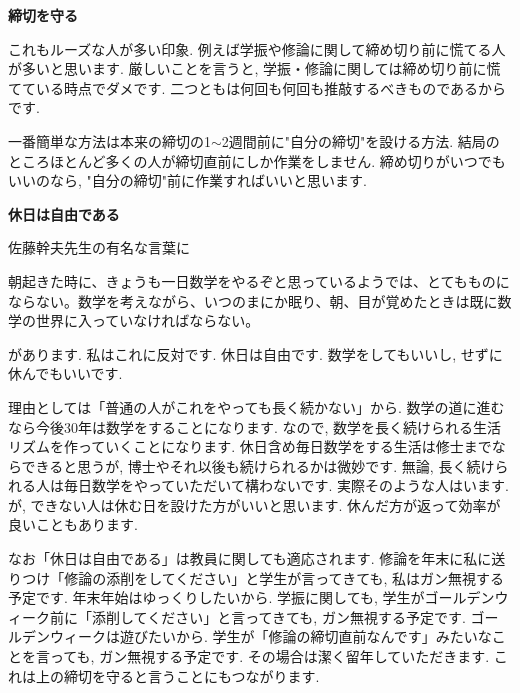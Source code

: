 \textbf{締切を守る}  　\vspace{-6pt} 

これもルーズな人が多い印象. 例えば学振や修論に関して締め切り前に慌てる人が多いと思います. 
厳しいことを言うと, 学振・修論に関しては締め切り前に慌てている時点でダメです. 
二つともは何回も何回も推敲するべきものであるからです.  

一番簡単な方法は本来の締切の1$\sim$2週間前に"自分の締切"を設ける方法. 
結局のところほとんど多くの人が締切直前にしか作業をしません. 締め切りがいつでもいいのなら, "自分の締切"前に作業すればいいと思います. 

\vspace{8pt} 

\textbf{休日は自由である}  　\vspace{-6pt} 

佐藤幹夫先生の有名な言葉に
\begin{tcolorbox}[mybox]
朝起きた時に、きょうも一日数学をやるぞと思っているようでは、とてもものにならない。数学を考えながら、いつのまにか眠り、朝、目が覚めたときは既に数学の世界に入っていなければならない。
\end{tcolorbox}
 があります. 私はこれに反対です. 休日は自由です. 数学をしてもいいし, せずに休んでもいいです. 

理由としては「普通の人がこれをやっても長く続かない」から. 
数学の道に進むなら今後30年は数学をすることになります. なので, 数学を長く続けられる生活リズムを作っていくことになります. 
休日含め毎日数学をする生活は修士までならできると思うが, 博士やそれ以後も続けられるかは微妙です. 
無論, 長く続けられる人は毎日数学をやっていただいて構わないです. 実際そのような人はいます.
が, できない人は休む日を設けた方がいいと思います. 休んだ方が返って効率が良いこともあります. 

なお「休日は自由である」は教員に関しても適応されます. 修論を年末に私に送りつけ「修論の添削をしてください」と学生が言ってきても, 私はガン無視する予定です. 年末年始はゆっくりしたいから. 学振に関しても, 学生がゴールデンウィーク前に「添削してください」と言ってきても, ガン無視する予定です. ゴールデンウィークは遊びたいから. 学生が「修論の締切直前なんです」みたいなことを言っても, ガン無視する予定です. その場合は潔く留年していただきます. これは上の締切を守ると言うことにもつながります. 

